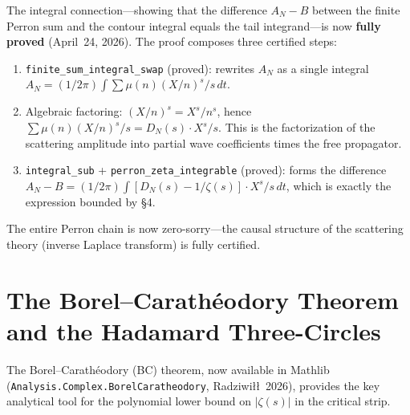 \documentclass[11pt,a4paper]{article}
\theoremstyle{definition}
\newcommand{\lean}[1]{\texttt{#1}}
\begin{document}
The integral connection---showing that the difference $A_N - B$ between
the finite Perron sum and the contour integral equals the tail integrand---is
now \textbf{fully proved} (April~24, 2026). The proof composes three certified steps:
\begin{enumerate}
  \item \lean{finite\_sum\_integral\_swap} (proved): rewrites $A_N$ as a
    single integral $A_N = (1/2\pi) \int \sum \mu(n)(X/n)^s/s\,dt$.
  \item Algebraic factoring: $(X/n)^s = X^s/n^s$, hence
    $\sum \mu(n)(X/n)^s/s = D_N(s) \cdot X^s/s$. This is the factorization
    of the scattering amplitude into partial wave coefficients times the
    free propagator.
  \item \lean{integral\_sub} + \lean{perron\_zeta\_integrable} (proved): forms
    the difference $A_N - B = (1/2\pi)\int [D_N(s) - 1/\zeta(s)] \cdot X^s/s\,dt$,
    which is exactly the expression bounded by \S4.
\end{enumerate}
The entire Perron chain is now zero-sorry---the causal structure of the
scattering theory (inverse Laplace transform) is fully certified.

\section{The Borel--Carath\'eodory Theorem and the Hadamard Three-Circles}
\label{sec:bc}

The Borel--Carath\'eodory (BC) theorem, now available in Mathlib
(\texttt{Analysis.Complex.BorelCaratheodory}, Radziwi{\l}{\l}\ 2026),
provides the key analytical tool for the polynomial lower bound on
$|\zeta(s)|$ in the critical strip.
\end{document}
